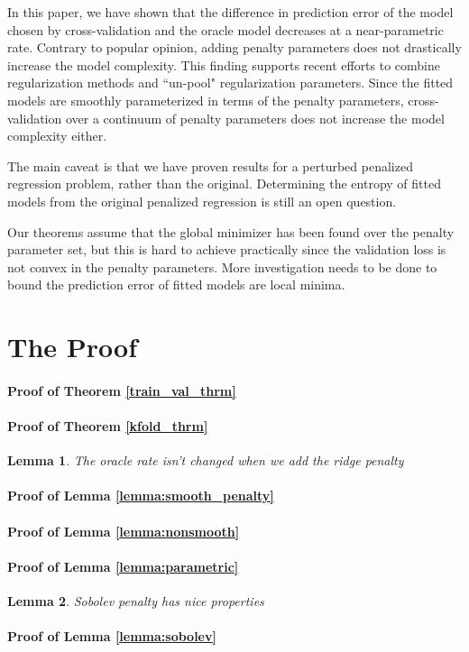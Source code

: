 \documentclass[12pt]{article}
\newtheorem{lemma}{Lemma}
\begin{document}
In this paper, we have shown that the difference in prediction error of the model chosen by cross-validation and the oracle model decreases at a near-parametric rate. Contrary to popular opinion, adding penalty parameters does not drastically increase the model complexity. This finding supports recent efforts to combine regularization methods and ``un-pool" regularization parameters. Since the fitted models are smoothly parameterized in terms of the penalty parameters, cross-validation over a continuum of penalty parameters does not increase the model complexity either.

The main caveat is that we have proven results for a perturbed penalized regression problem, rather than the original. Determining the entropy of fitted models from the original penalized regression is still an open question.

Our theorems assume that the global minimizer has been found over the penalty parameter set, but this is hard to achieve practically since the validation loss is not convex in the penalty parameters. More investigation needs to be done to bound the prediction error of fitted models are local minima.

\section{The Proof} \label{sec:proofs}

\paragraph{Proof of Theorem \ref{train_val_thrm}}

\paragraph{Proof of Theorem \ref{kfold_thrm}}

\begin{lemma}
\label{oracle_maintained}
The oracle rate isn't changed when we add the ridge penalty
\end{lemma}

\paragraph{Proof of Lemma \ref{lemma:smooth_penalty}}
\paragraph{Proof of Lemma \ref{lemma:nonsmooth}}

\paragraph{Proof of Lemma \ref{lemma:parametric}}

\begin{lemma}
\label{lemma:sobolev_prop}
Sobolev penalty has nice properties
\end{lemma}

\paragraph{Proof of Lemma \ref{lemma:sobolev}}

\bigskip
\end{document}
